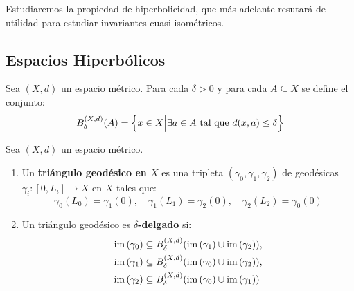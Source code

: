 \documentclass[12pt]{report}
\newcounter{it}
\theoremstyle{largebreak}
\newcommand\cf[3]{\ensuremath{#1:#2\rightarrow#3}}
\begin{document}
    Estudiaremos la propiedad de hiperbolicidad, que más adelante resutará de utilidad para estudiar invariantes cuasi-isométricos.

    \subsection{Espacios Hiperbólicos}

    \newcommand{\im}[1]{\ensuremath{\textup{im}\left(#1\right)}}
    \newcommand{\Diam}[1]{\ensuremath{\textup{diam}\left(#1\right)}}

    \begin{mydef}
        Sea $(X,d)$ un espacio métrico. Para cada $\delta>0$ y para cada $A\subseteq X$ se define el conjunto:
        \begin{equation*}
            B_\delta^{(X,d)}(A)=\left\{x\in X\Big|\exists a\in A\textup{ tal que }d(x,a)\leq\delta \right\}
        \end{equation*}
    \end{mydef}

    \begin{mydef}
        Sea $(X,d)$ un espacio métrico.
        \begin{enumerate}[label = \textit{\arabic*}]
            \item Un \textbf{triángulo geodésico en $X$} es una tripleta $(\gamma_0,\gamma_1,\gamma_2)$ de geodésicas $\cf{\gamma_i}{[0,L_i]}{X}$ en $X$ tales que:
            \begin{equation*}
                \gamma_0(L_0)=\gamma_1(0),\quad \gamma_1(L_1)=\gamma_2(0),\quad \gamma_2(L_2)=\gamma_0(0)
            \end{equation*}
            \item Un triángulo geodésico es \textbf{$\delta$-delgado} si:
            \begin{equation*}
                \begin{split}
                    \im{\gamma_0}&\subseteq B_{\delta}^{(X,d)}(\im{\gamma_1}\cup\im{\gamma_2}),\\
                    \im{\gamma_1}&\subseteq B_{\delta}^{(X,d)}(\im{\gamma_0}\cup\im{\gamma_2}),\\
                    \im{\gamma_2}&\subseteq B_{\delta}^{(X,d)}(\im{\gamma_0}\cup\im{\gamma_1})\\
                \end{split}
            \end{equation*}
        \end{enumerate}
    \end{mydef}
\end{document}

